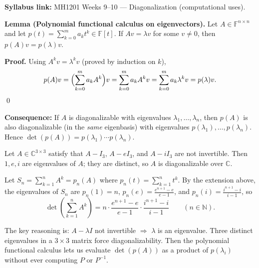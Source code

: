 \begin{extension}[title={Extension (Tutorial 8, Question 3, Method 2)}]
\textbf{Syllabus link:} MH1201 Weeks 9--10 --- Diagonalization (computational uses).

\textbf{Lemma (Polynomial functional calculus on eigenvectors).}
Let $A\in\mathbb{F}^{n\times n}$ and let $p(t)=\sum_{k=0}^m a_k t^k\in\mathbb{F}[t]$.
If $Av=\lambda v$ for some $v\neq 0$, then $p(A)v=p(\lambda)v$.

\textbf{Proof.}
Using $A^k v=\lambda^k v$ (proved by induction on $k$),
\[
p(A)v=\Bigl(\sum_{k=0}^m a_k A^k\Bigr)v=\sum_{k=0}^m a_k A^k v=\sum_{k=0}^m a_k \lambda^k v=p(\lambda)v.
\]
\qed

\textbf{Consequence:} If $A$ is diagonalizable with eigenvalues $\lambda_1,\dots,\lambda_n$, then $p(A)$ is also diagonalizable (in the \emph{same} eigenbasis) with eigenvalues $p(\lambda_1),\dots,p(\lambda_n)$.
Hence $\det(p(A)) = p(\lambda_1)\cdots p(\lambda_n)$.
\end{extension}

\begin{examplebox}[title={Worked Example (Tutorial 8, Question 3): determinant of $\sum_{k=1}^n A^k$}]
Let $A\in\mathbb{C}^{3\times 3}$ satisfy that $A-I_3$, $A-eI_3$, and $A-iI_3$ are not invertible.
Then $1,e,i$ are eigenvalues of $A$; they are distinct, so $A$ is diagonalizable over $\mathbb{C}$.

Let $S_n=\sum_{k=1}^n A^k=p_n(A)$ where $p_n(t)=\sum_{k=1}^n t^k$.
By the extension above, the eigenvalues of $S_n$ are $p_n(1)=n$, $p_n(e)=\frac{e^{n+1}-e}{e-1}$, and $p_n(i)=\frac{i^{n+1}-i}{i-1}$,
so
\[
\det\!\left(\sum_{k=1}^n A^k\right)=n\cdot \frac{e^{n+1}-e}{e-1}\cdot \frac{i^{n+1}-i}{i-1}\qquad(n\in\mathbb{N}).
\]
\end{examplebox}

The key reasoning is: $A-\lambda I$ not invertible $\Rightarrow$ $\lambda$ is an eigenvalue.
Three distinct eigenvalues in a $3\times 3$ matrix force diagonalizability.
Then the polynomial functional calculus lets us evaluate $\det(p(A))$ as a product of $p(\lambda_i)$ without ever computing $P$ or $P^{-1}$.

